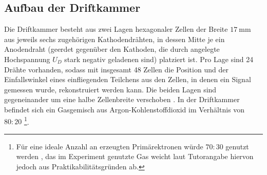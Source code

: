\subsection{Aufbau der Driftkammer}\label{sec:driftkammer_aufbau}

Die Driftkammer besteht aus zwei Lagen hexagonaler Zellen der Breite $\SI{17}{\milli\m}$ aus jeweils sechs zugehörigen Kathodendrähten, in dessen Mitte je ein Anodendraht (geerdet gegenüber den Kathoden, die durch angelegte Hochspannung $U_D$ stark negativ geladenen sind) platziert ist. Pro Lage sind 24 Drähte vorhanden, sodass mit insgesamt 48 Zellen die Position und der Einfallswinkel eines einfliegenden Teilchens aus den Zellen, in denen ein Signal gemessen wurde, rekonstruiert werden kann. Die beiden Lagen sind gegeneinander um eine halbe Zellenbreite verschoben \cite[18-19]{hammanndiplom}. In der Driftkammer befindet sich ein Gasgemisch aus Argon-Kohlenstoffdioxid im Verhältnis von $80:20$ \footnote{Für eine ideale Anzahl an erzeugten Primärektronen würde $70:30$ genutzt werden \cite[16]{hammanndiplom}, das im Experiment genutzte Gas weicht laut Tutorangabe hiervon jedoch aus Praktikabilitätsgründen ab.}.


